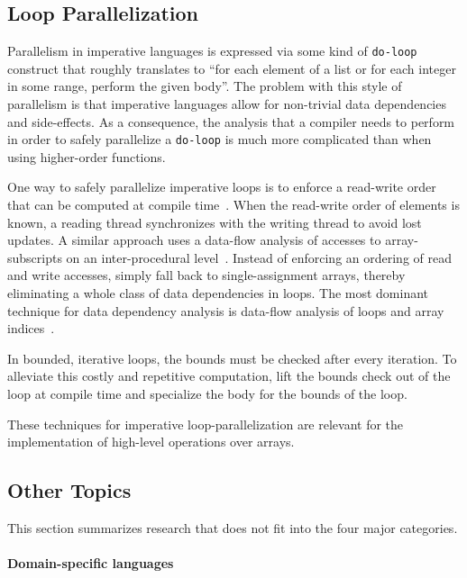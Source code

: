 \documentclass[a4paper]{article}
\begin{document}
\subsection{Loop Parallelization}
\label{sec:loop-parallelization}

Parallelism in imperative languages is expressed via some kind of \texttt{do-loop} construct that roughly translates to ``for each element of a list or for each integer in some range, perform the given body''. The problem with this style of parallelism is that imperative languages allow for non-trivial data dependencies and side-effects. As a consequence, the analysis that a compiler needs to perform in order to safely parallelize a \texttt{do-loop} is much more complicated than when using higher-order functions.

One way to safely parallelize imperative loops is to enforce a read-write order that can be computed at compile time~\cite{Tang:1990:CTD:77726.255155}. When the read-write order of elements is known, a reading thread synchronizes with the writing thread to avoid lost updates. A similar approach uses a data-flow analysis of accesses to array-subscripts on an inter-procedural level~\cite{Maydan:1993:AFA:158511.158515}. Instead of enforcing an ordering of read and write accesses, \citet{Knobe:1998:ASF:268946.268956} simply fall back to single-assignment arrays, thereby eliminating a whole class of data dependencies in loops. The most dominant technique for data dependency analysis is data-flow analysis of loops and array indices~\cite{Maydan:1993:AFA:158511.158515, Knobe:1998:ASF:268946.268956}.

In bounded, iterative loops, the bounds must be checked after every iteration. To alleviate this costly and repetitive computation, \citet{Henriksen:2014:BCI:2627373.2627388} lift the bounds check out of the loop at compile time and specialize the body for the bounds of the loop.

These techniques for imperative loop-parallelization are relevant for the implementation of high-level operations over arrays.

\subsection{Other Topics}
\label{sec:other-topics}

This section summarizes research that does not fit into the four major categories.

\paragraph{Domain-specific languages}
\end{document}

